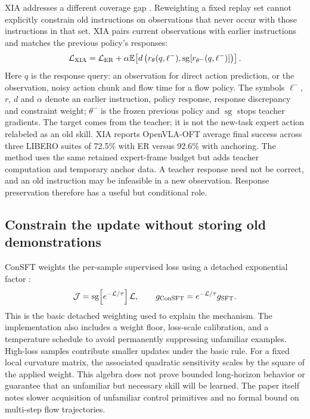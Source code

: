 \documentclass[11pt,a4paper]{article}
\begin{document}
XIA addresses a different coverage gap \cite{xia}. Reweighting a fixed replay set cannot explicitly constrain old instructions on observations that never occur with those instructions in that set. XIA pairs current observations with earlier instructions and matches the previous policy's responses:
\begin{equation}
\mathcal L_{\rm XIA}=\mathcal L_{\rm ER}+\alpha\mathbb E\!\left[d\left(r_\theta(q,\ell^-),\operatorname{sg}[r_{\theta^-}(q,\ell^-)]\right)\right].
\end{equation}
Here $q$ is the response query: an observation for direct action prediction, or the observation, noisy action chunk and flow time for a flow policy. The symbols $\ell^-$, $r$, $d$ and $\alpha$ denote an earlier instruction, policy response, response discrepancy and constraint weight; $\theta^-$ is the frozen previous policy and $\operatorname{sg}$ stops teacher gradients. The target comes from the teacher; it is not the new-task expert action relabeled as an old skill. XIA reports OpenVLA-OFT average final success across three LIBERO suites of 72.5\% with ER versus 92.6\% with anchoring. The method uses the same retained expert-frame budget but adds teacher computation and temporary anchor data. A teacher response need not be correct, and an old instruction may be infeasible in a new observation. Response preservation therefore has a useful but conditional role.

\subsection{Constrain the update without storing old demonstrations}
ConSFT weights the per-sample supervised loss using a detached exponential factor \cite{consft}:
\begin{equation}
\mathcal J=\operatorname{sg}\!\left[e^{-\mathcal L/\tau}\right]\mathcal L,
\qquad g_{\rm ConSFT}=e^{-\mathcal L/\tau}g_{\rm SFT}.
\end{equation}
This is the basic detached weighting used to explain the mechanism. The implementation also includes a weight floor, loss-scale calibration, and a temperature schedule to avoid permanently suppressing unfamiliar examples. High-loss samples contribute smaller updates under the basic rule. For a fixed local curvature matrix, the associated quadratic sensitivity scales by the square of the applied weight. This algebra does not prove bounded long-horizon behavior or guarantee that an unfamiliar but necessary skill will be learned. The paper itself notes slower acquisition of unfamiliar control primitives and no formal bound on multi-step flow trajectories.
\end{document}
